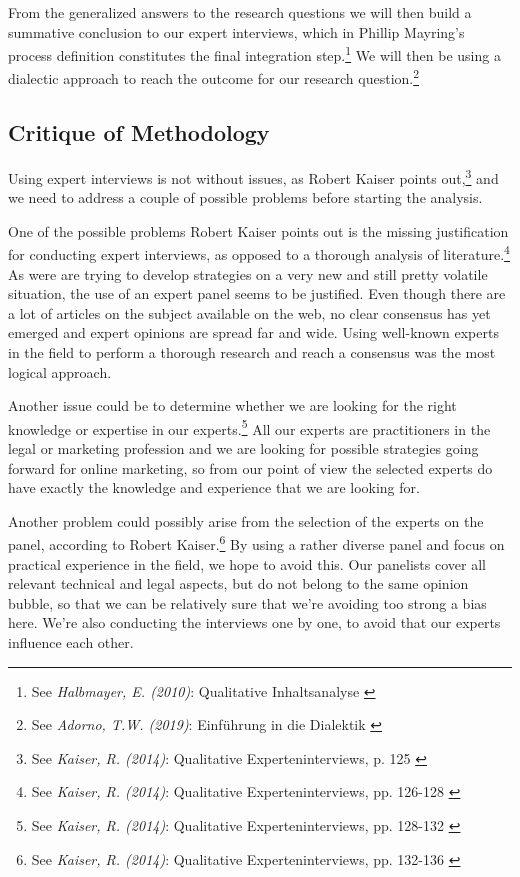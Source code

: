 From the generalized answers to the research questions we will then build a summative conclusion to our expert interviews, which in Phillip Mayring's process definition constitutes the final integration step.\footnote{See \textit{Halbmayer, E. (2010)}: Qualitative Inhaltsanalyse \cite{summaryVienna}} We will then be using a dialectic approach to reach the outcome for our research question.\footnote{See \textit{Adorno, T.W. (2019)}: Einführung in die Dialektik \cite{introDialectic}}

\subsection{Critique of Methodology}

Using expert interviews is not without issues, as Robert Kaiser points out,\footnote{See \textit{Kaiser, R. (2014)}: Qualitative Experteninterviews, p. 125 \cite{expertInterviews}} and we need to address a couple of possible problems before starting the analysis.

One of the possible problems Robert Kaiser points out is the missing justification for conducting expert interviews, as opposed to a thorough analysis of literature.\footnote{See \textit{Kaiser, R. (2014)}: Qualitative Experteninterviews, pp. 126-128 \cite{expertInterviews}} As were are trying to develop strategies on a very new and still pretty volatile situation, the use of an expert panel seems to be justified. Even though there are a lot of articles on the subject available on the web, no clear consensus has yet emerged and expert opinions are spread far and wide. Using well-known experts in the field to perform a thorough research and reach a consensus was the most logical approach.

Another issue could be to determine whether we are looking for the right knowledge or expertise in our experts.\footnote{See \textit{Kaiser, R. (2014)}: Qualitative Experteninterviews, pp. 128-132 \cite{expertInterviews}} All our experts are practitioners in the legal or marketing profession and we are looking for possible strategies going forward for online marketing, so from our point of view the selected experts do have exactly the knowledge and experience that we are looking for.

Another problem could possibly arise from the selection of the experts on the panel, according to Robert Kaiser.\footnote{See \textit{Kaiser, R. (2014)}: Qualitative Experteninterviews, pp. 132-136 \cite{expertInterviews}} By using a rather diverse panel and focus on practical experience in the field, we hope to avoid this. Our panelists cover all relevant technical and legal aspects, but do not belong to the same opinion bubble, so that we can be relatively sure that we're avoiding too strong a bias here. We're also conducting the interviews one by one, to avoid that our experts influence each other.

